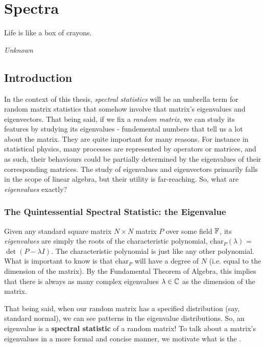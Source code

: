 
\chapter{Spectra}

\epigraph{Life is like a box of crayons.}{\textit{Unknown}}

\section{Introduction}

In the context of this thesis, \textit{spectral statistics} will be an umbrella term for random matrix statistics that somehow involve that matrix's eigenvalues and eigenvectors.
That being said, if we fix a \textit{random matrix}, we can study its features by studying its eigenvalues - fundemental numbers that tell us a lot about the matrix.
They are quite important for many reasons.
For instance in statistical physics, many processes are represented by operators or matrices, and as such, their behaviours could be partially determined by the eigenvalues of their corresponding matrices.
The study of eigenvalues and eigenvectors primarily falls in the scope of linear algebra, but their utility is far-reaching. So, what are \textit{eigenvalues} exactly?


\subsection{The Quintessential Spectral Statistic: the Eigenvalue}
Given any standard square matrix $N \times N$ matrix $P$ over some field $\mathbb{F}$,
its \textit{eigenvalues} are simply the roots of the characteristic polynomial, $\text{char}_P{(\lambda)}$ = $\det(P - \lambda I)$.
The characteristic polynomial is just like any other polynomial. What is important to know is that $\text{char}_P$ will have a degree of $N$ (i.e. equal to the dimension of the matrix).
By the Fundamental Theorem of Algebra, this implies that there is always as many complex eigenvalues $\lambda \in \mathbb{C}$ as the dimension of the matrix.

That being said, when our random matrix has a specified distribution (say, standard normal), we can see patterns in the eigenvalue distributions.
So, an eigenvalue is a \textbf{spectral statistic} of a random matrix! To talk about a matrix's eigenvalues in a more formal and concise manner, we motivate what is the .

